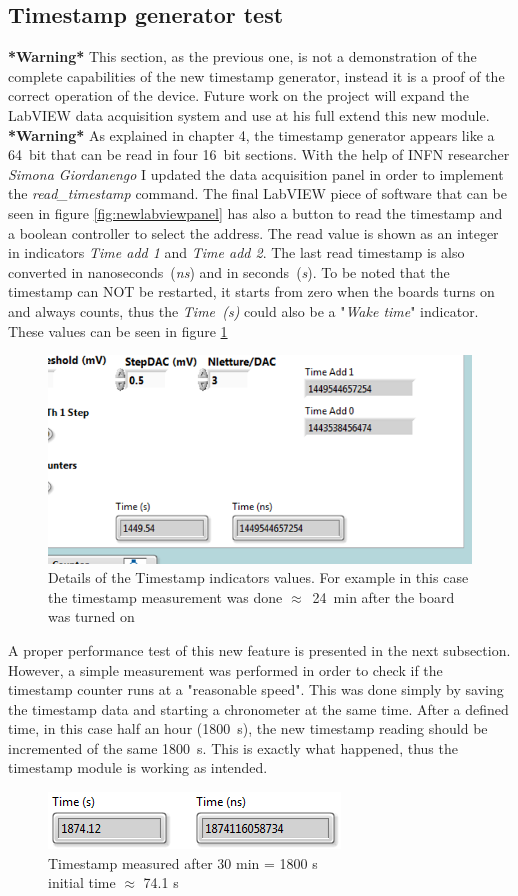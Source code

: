 \subsection{Timestamp generator test}
\noindent \textbf{*Warning*} This section, as the previous one, is not a demonstration of the complete capabilities of the new timestamp generator, instead it is a proof of the correct operation of the device. Future work on the project will expand the LabVIEW data acquisition system and use at his full extend this new module. \textbf{*Warning*}
\newline
As explained in chapter 4, the timestamp generator appears like a 64~bit that can be read in four 16~bit sections.
With the help of INFN researcher \textit{Simona Giordanengo} I updated the data acquisition panel in order to implement the \textit{read\_timestamp} command.
The final LabVIEW piece of software that can be seen in figure \ref{fig:newlabviewpanel} has also a button to read the timestamp and a boolean controller to select the address.
The read value is shown as an integer in indicators \textit{Time add 1} and \textit{Time add 2}. The last read timestamp is also converted in nanoseconds~(\textit{ns}) and in seconds~(\textit{s}).
To be noted that the timestamp can NOT be restarted, it starts from zero when the boards turns on and always counts, thus the \textit{Time~(s)} could also be a "\textit{Wake time}" indicator.
These values can be seen in figure \ref{fig:timestampfigure}
\begin{figure}[H]
	\centering
	\includegraphics[width=0.5\linewidth]{IMG/ch5/latch_tests/fig15.PNG}
	\caption{Details of the Timestamp indicators values. For example in this case the timestamp measurement was done $\approx$~24~min after the board was turned on}
	\label{fig:timestampfigure}
\end{figure}
\noindent A proper performance test of this new feature is presented in the next subsection. However, a simple measurement was performed in order to check if the timestamp counter runs at a "reasonable speed".
This was done simply by saving the timestamp data and starting a chronometer at the same time. After a defined time, in this case half an hour (1800~s), the new timestamp reading should be incremented of the same 1800~s.
This is exactly what happened, thus the timestamp module is working as intended.  
\begin{figure}[H]
	\centering
	\includegraphics[width=0.35\linewidth]{IMG/ch5/latch_tests/fig20.PNG}
	\caption{Timestamp measured after 30 min = 1800 s\\initial time $\approx$ 74.1 s}
	\label{fig:timestamptest}
\end{figure}

